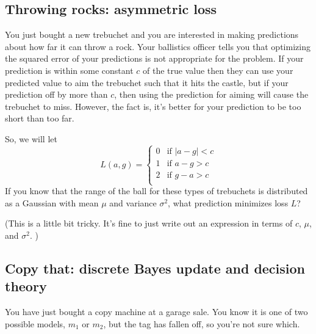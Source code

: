 \documentclass[11pt]{exam}
\begin{document}
\subsection{Throwing rocks:  asymmetric loss}
You just bought a new trebuchet and you are interested in making
predictions about how far it can throw a rock.  Your ballistics
officer tells you that optimizing the squared error of your
predictions is not appropriate for the problem.   If your
prediction is within some constant $c$ of the true value then they can
use your predicted value to aim the trebuchet such that it hits the castle, but if
your prediction off by more than $c$, then using the prediction for aiming will
cause the trebuchet to miss.  However, the fact is, it's better for
your prediction to be too short than too far.

So, we will let
\[L(a, g) = \begin{cases}
    0 & \text{if $|a - g| < c$}\\
    1 & \text{if $a - g > c$} \\
    2 & \text{if $g - a > c$} \\
  \end{cases}
\]
If you know that the range
of the ball for these types of trebuchets is distributed as a Gaussian with mean $\mu$ and variance
$\sigma^2$, what prediction minimizes loss $L$?

(This is a little bit tricky.  It's fine to just write out an
expression in terms of $c$, $\mu$, and $\sigma^2$.  )

  

\subsection{Copy that: discrete Bayes update and decision theory}

You have just bought a copy machine at a garage sale.  You know it is
one of two possible models, $m_1$ or $m_2$, but the tag has
fallen off, so you're not sure which.
\end{document}
